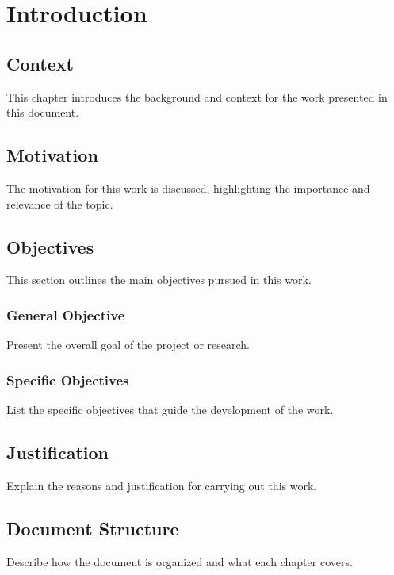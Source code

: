 
\chapter{Introduction}\label{cap:intro}


\section{Context}
This chapter introduces the background and context for the work presented in this document.


\section{Motivation}
The motivation for this work is discussed, highlighting the importance and relevance of the topic.


\section{Objectives}
This section outlines the main objectives pursued in this work.


\subsection{General Objective}
Present the overall goal of the project or research.


\subsection{Specific Objectives}
List the specific objectives that guide the development of the work.


\section{Justification}
Explain the reasons and justification for carrying out this work.


\section{Document Structure}
Describe how the document is organized and what each chapter covers.